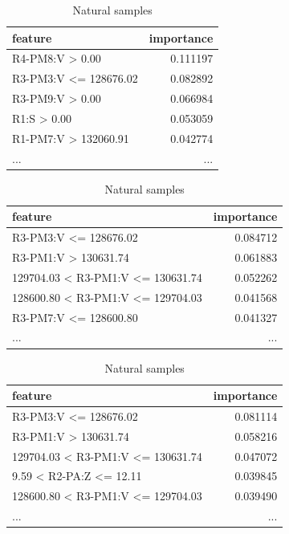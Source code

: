 \begin{table}[H]
    \footnotesize
    \centering
    \caption{5 most important features by class for MLP classifier} \label{tab:5best_mlp}
    \begin{subtable}[t]{0.5\linewidth}
        \centering
        \caption{NoEvents samples} 
        \begin{tabular}{lr}\toprule
            feature  &importance\\\midrule            
            R4-PM8:V > 0.00        &  0.111197 \\
            R3-PM3:V <= 128676.02  &  0.082892 \\
            R3-PM9:V > 0.00        &  0.066984 \\
            R1:S > 0.00            &  0.053059 \\
            R1-PM7:V > 132060.91   &  0.042774 \\
            ...                          & ... \\\bottomrule
        \end{tabular}
    \end{subtable}%
    \begin{subtable}[t]{0.5\linewidth}
        \centering
        \caption{Attack samples} 
        \begin{tabular}{lr}\toprule
            feature                   & importance \\\midrule
            R3-PM3:V <= 128676.02              &  0.084712  \\
            R3-PM1:V > 130631.74               &  0.061883 \\
            129704.03 < R3-PM1:V <= 130631.74  &  0.052262 \\
            128600.80 < R3-PM1:V <= 129704.03  &  0.041568 \\
            R3-PM7:V <= 128600.80              &  0.041327 \\
            ...                           & ... \\\bottomrule
        \end{tabular}
    \end{subtable}
    \begin{subtable}[b]{0.5\linewidth}
        \centering\vspace*{.5cm}
        \caption{Natural samples} 
        \begin{tabular}{lr}\toprule
            feature                & importance   \\\midrule    
            R3-PM3:V <= 128676.02              &  0.081114 \\
            R3-PM1:V > 130631.74               &  0.058216 \\
            129704.03 < R3-PM1:V <= 130631.74  &  0.047072 \\
            9.59 < R2-PA:Z <= 12.11            &  0.039845 \\
            128600.80 < R3-PM1:V <= 129704.03  &  0.039490 \\
            ...                    &       ...    \\\bottomrule
        \end{tabular}
    \end{subtable}
\end{table}

